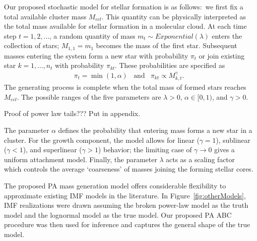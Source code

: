 \documentclass[12pt]{article}
\begin{document}
Our proposed stochastic model for stellar formation is as follows:~we first fix a total available cluster mass $M_{ecl}$. 
This quantity can be physically interpreted as the total mass available for stellar formation in a molecular cloud. 
At each time step $t = 1, 2, \ldots$, a random quantity of mass $m_t \sim Exponential(\lambda)$ enters the collection of stars; $M_{1,1} = m_1$ becomes the mass of the first star.
Subsequent masses entering the system form a new star with probability $\pi_t$ or join existing star $k = 1, \ldots, n_t$ with probability $\pi_{kt}$.
These probabilities are specified as
\begin{align}
	\pi_t = \min \left (1, \alpha \right ) \;\;\; \text{and} \;\;\; \pi_{kt} \propto M_{k,t}^{\gamma}\text{.}
\label{eq:PAstars}
\end{align}
The generating process is complete when the total mass of formed stars reaches $M_{ecl}$. 
The possible ranges of the five parameters are $\lambda > 0$, $\alpha \in [0,1)$, and $\gamma > 0$. 

\begin{center}
{\color{red}
Proof of power law tails???  Put in appendix.
}
\end{center}


The parameter $\alpha$ defines the probability that entering mass forms a new star in a cluster.  For the growth component, the model allows for linear ($\gamma = 1$), sublinear ($\gamma < 1$), and superlinear ($\gamma > 1$) behavior; the limiting case of $\gamma \to 0$ gives a uniform attachment model.  Finally, the parameter $\lambda$ acts as a scaling factor which controls the average `coarseness' of masses joining the forming stellar cores. 

The proposed PA mass generation model offers considerable flexibility to approximate existing IMF models in the literature.  In Figure~\ref{fig:otherModels}, IMF realizations were drawn assuming the \cite{kroupa2001} broken power-law model as the truth model and the \cite{chabrier2005} lognormal model as the true model.  Our proposed PA ABC procedure was then used for inference and captures the general shape of the true model.
\end{document}

